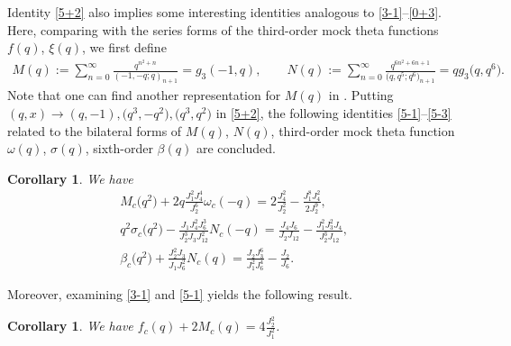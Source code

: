 \documentclass[10pt,a4paper]{amsart}
\numberwithin{equation}{section}
\newtheorem{Corollary}[Theorem]{Corollary}
\begin{document}
Identity \eqref{5+2} also implies some interesting identities analogous to \eqref{3-1}--\eqref{0+3}. Here, comparing with the series forms of the third-order mock theta functions $f(q)$, $\xi(q)$, we first define
\begin{gather*}
M(q):=\sum_{n=0}^{\infty}\frac{q^{n^2+n}}{(-1,-q;q)_{n+1}}=g_3(-1,q),\qquad
N(q):=\sum_{n=0}^{\infty}\frac{q^{6n^2+6n+1}}{\bigl(q,q^5;q^6\bigr)_{n+1}}=qg_3\bigl(q,q^6\bigr).
\end{gather*}
Note that one can find another representation for $M(q)$ in \cite{SW}. Putting $(q,x)\rightarrow(q,-1),\allowbreak \bigl(q^3,-q^2\bigr), \bigl(q^3,q^2\bigr)$ in \eqref{5+2}, the following identities \eqref{5-1}--\eqref{5-3} related to the bilateral forms of $M(q)$, $N(q)$, third-order mock theta function $\omega(q)$, $\sigma(q)$, sixth-order $\beta(q)$ are concluded.
\begin{Corollary}
We have
\begin{gather}
M_c\bigl(q^2\bigr)+2q\frac{J_1^2J_4^4}{J_2^6}\omega_c(-q)
=2\frac{J_4^2}{J_2^2}-\frac{J_1^8J_4^2}{2J_2^9},\label{5-1}\\
q^2\sigma_c\bigl(q^2\bigr)-\frac{J_1J_4^2J_6^3}{J_2^3J_3J_{12}^2}N_c(-q)
=\frac{J_4J_6}{J_2J_{12}}-\frac{J_1^2J_3^2J_4}{J_2^3J_{12}},\label{5-2}\\
\beta_c\bigl(q^2\bigr)+\frac{J_2^2J_3}{J_1J_6^2}N_c(q)
=\frac{J_2J_3^6}{J_1^2J_6^4}-\frac{J_2}{J_6}.\label{5-3}
\end{gather}
\end{Corollary}
Moreover, examining \eqref{3-1} and \eqref{5-1} yields the following result.
\begin{Corollary}
We have
$
f_c(q)+2M_c(q)=4\frac{J_2^2}{J_1^2}$.
\end{Corollary}
\end{document}

